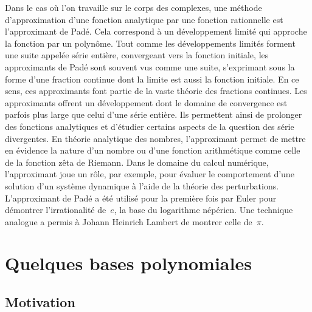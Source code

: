  Dans le cas où l'on travaille sur le corps des complexes, une méthode d'approximation d'une fonction analytique par une fonction rationnelle est l'approximant de Padé. Cela correspond à un développement limité qui approche la fonction par un polynôme. Tout comme les développements limités forment une suite appelée série entière, convergeant vers la fonction initiale, les approximants de Padé sont souvent vus comme une suite, s'exprimant sous la forme d'une fraction continue dont la limite est aussi la fonction initiale. En ce sens, ces approximants font partie de la vaste théorie des fractions continues. Les approximants offrent un développement dont le domaine de convergence est parfois plus large que celui d'une série entière. Ils permettent ainsi de prolonger des fonctions analytiques et d'étudier certains aspects de la question des série divergentes. En théorie analytique des nombres, l'approximant permet de mettre en évidence la nature d'un nombre ou d'une fonction arithmétique comme celle de la fonction zêta de Riemann. Dans le domaine du calcul numérique, l'approximant joue un rôle, par exemple, pour évaluer le comportement d'une solution d'un système dynamique à l'aide de la théorie des perturbations. L'approximant de Padé a été utilisé pour la première fois par Euler pour démontrer l'irrationalité de~$e$, la base du logarithme népérien. Une technique analogue a permis à Johann Heinrich Lambert de montrer celle de~$\pi$.


\medskip\ifVersionDuDocEstVincent\else\newpage\fi
\section{Quelques bases polynomiales} 

\medskip
\subsection{Motivation}\label{Sec-Taylor}

